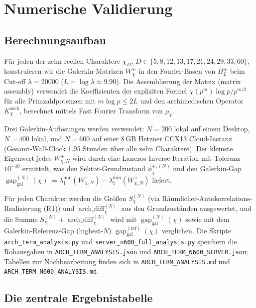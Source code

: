 \documentclass[a4paper,10pt,twocolumn]{article}
\theoremstyle{definition}
\theoremstyle{remark}
\newcommand{\gap}{\operatorname{gap}}
\newcommand{\chifn}{\chi}
\newcommand{\archdiff}{\operatorname{arch\_diff}}
\begin{document}
\section{Numerische Validierung}
\label{sec:validation}

\subsection{Berechnungsaufbau}
\label{sec:validation-setup}

Für jeden der zehn reellen Charaktere $\chifn_D$,
$D\in\{5,8,12,13,17,21,24,29,33,60\}$, konstruieren wir die Galerkin-Matrizen
$W^\pm_{\chifn}$ in den Fourier-Basen von $H_L^\pm$ beim Cut-off
$\lambda=20000$ ($L=\log\lambda\approx 9.90$). Die Assemblierung der Matrix (matrix assembly) verwendet die
Koeffizienten der expliziten Formel $\chifn(p^m)\log p/p^{m/2}$ für alle
Primzahlpotenzen mit $m\log p\leq 2L$ und den archimedischen Operator
$K^{\mathrm{arch}}_{\chifn}$, berechnet mittels Fast Fourier Transform von
$\rho_{\chifn}$.

Drei Galerkin-Auflösungen werden verwendet: $N=200$ lokal auf einem Desktop,
$N=400$ lokal, und $N=600$ auf einer 8\,GB Hetzner CCX13 Cloud-Instanz
(Gesamt-Wall-Clock 1.95 Stunden über alle zehn Charaktere). Der
kleinste Eigenwert jedes $W^\pm_{\chifn,N}$ wird durch eine
Lanczos-Inverse-Iteration mit Toleranz $10^{-10}$ ermittelt, was den
Sektor-Grundzustand $\phi^{\pm,(N)}_{\chifn}$ und den Galerkin-Gap
$\gap_{\mathrm{gal}}^{(N)}(\chifn)
:=\lambda_1^{\min}(W^-_{\chifn,N})-\lambda_1^{\min}(W^+_{\chifn,N})$ liefert.

Für jeden Charakter werden die Größen $S_{\chifn}^{(N)}$ (via
Räumlicher-Autokorrelations-Realisierung (R1)) und
$\archdiff_{\chifn}^{(N)}$ aus den Grundzuständen ausgewertet, und
die Summe $S_{\chifn}^{(N)}+\archdiff_{\chifn}^{(N)}$ wird mit
$\gap_{\mathrm{gal}}^{(N)}(\chifn)$ sowie mit dem Galerkin-Referenz-Gap (highest-$N$)
$\gap_{\mathrm{gal}}^{(\mathrm{ref})}(\chifn)$ verglichen. Die Skripte
\texttt{arch\_term\_analysis.py} und
\texttt{server\_n600\_full\_analysis.py} speichern die Rohausgaben in
\texttt{ARCH\_TERM\_ANALYSIS.json} und
\texttt{ARCH\_TERM\_N600\_SERVER.json}; Tabellen zur Nachbearbeitung
finden sich in \texttt{ARCH\_TERM\_ANALYSIS.md} und
\texttt{ARCH\_TERM\_N600\_ANALYSIS.md}.

\subsection{Die zentrale Ergebnistabelle}
\label{sec:validation-table}
\end{document}
